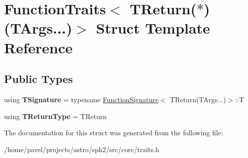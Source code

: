 \hypertarget{structFunctionTraits_3_01TReturn_07_5_08_07TArgs_8_8_8_08_4}{}\section{Function\+Traits$<$ T\+Return($\ast$)(T\+Args...)$>$ Struct Template Reference}
\label{structFunctionTraits_3_01TReturn_07_5_08_07TArgs_8_8_8_08_4}
\subsection*{Public Types}
\begin{DoxyCompactItemize}
\item 
\hypertarget{structFunctionTraits_3_01TReturn_07_5_08_07TArgs_8_8_8_08_4_a181f96d12b95a0690481ba21b6b07a19}{}\label{structFunctionTraits_3_01TReturn_07_5_08_07TArgs_8_8_8_08_4_a181f96d12b95a0690481ba21b6b07a19} 
using {\bfseries T\+Signature} = typename \hyperlink{structFunctionSignature}{Function\+Signature}$<$ T\+Return(T\+Args...)$>$\+::T
\item 
\hypertarget{structFunctionTraits_3_01TReturn_07_5_08_07TArgs_8_8_8_08_4_a15302b4e0fa16b72dadc32f7f0e6d7ec}{}\label{structFunctionTraits_3_01TReturn_07_5_08_07TArgs_8_8_8_08_4_a15302b4e0fa16b72dadc32f7f0e6d7ec} 
using {\bfseries T\+Return\+Type} = T\+Return
\end{DoxyCompactItemize}


The documentation for this struct was generated from the following file\+:\begin{DoxyCompactItemize}
\item 
/home/pavel/projects/astro/sph2/src/core/traits.\+h\end{DoxyCompactItemize}
